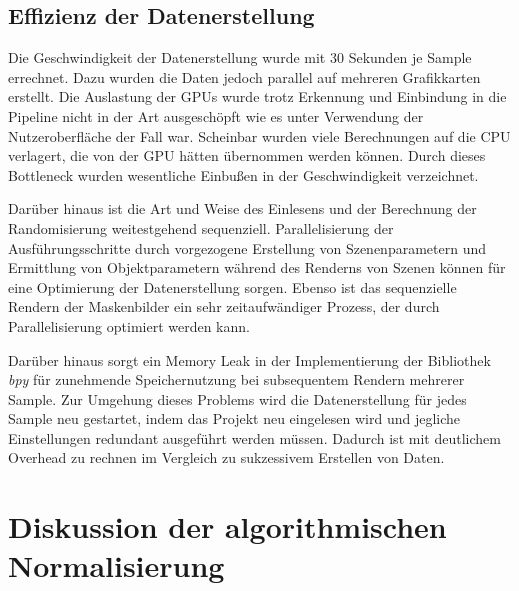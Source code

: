 \subsection{Effizienz der Datenerstellung}

Die Geschwindigkeit der Datenerstellung wurde mit 30 Sekunden je Sample errechnet. Dazu wurden die Daten jedoch parallel auf mehreren Grafikkarten erstellt. Die Auslastung der GPUs wurde trotz Erkennung und Einbindung in die Pipeline nicht in der Art ausgeschöpft wie es unter Verwendung der Nutzeroberfläche der Fall war. Scheinbar wurden viele Berechnungen auf die CPU verlagert, die von der GPU hätten übernommen werden können. Durch dieses Bottleneck wurden wesentliche Einbußen in der Geschwindigkeit verzeichnet.

Darüber hinaus ist die Art und Weise des Einlesens und der Berechnung der Randomisierung weitestgehend sequenziell. Parallelisierung der Ausführungsschritte durch vorgezogene Erstellung von Szenenparametern und Ermittlung von Objektparametern während des Renderns von Szenen können für eine Optimierung der Datenerstellung sorgen. Ebenso ist das sequenzielle Rendern der Maskenbilder ein sehr zeitaufwändiger Prozess, der durch Parallelisierung optimiert werden kann.

Darüber hinaus sorgt ein Memory Leak in der Implementierung der Bibliothek \textit{bpy} für zunehmende Speichernutzung bei subsequentem Rendern mehrerer Sample. Zur Umgehung dieses Problems wird die Datenerstellung für jedes Sample neu gestartet, indem das Projekt neu eingelesen wird und jegliche Einstellungen redundant ausgeführt werden müssen. Dadurch ist mit deutlichem Overhead zu rechnen im Vergleich zu sukzessivem Erstellen von Daten.



\section{Diskussion der algorithmischen Normalisierung}
\label{sec:diskussion:cv}

